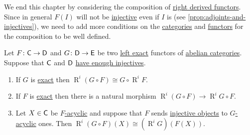 \documentclass[../../main]{subfiles}
\begin{document}
We end this chapter by considering the composition of \hyperref[def:right-derived-functor]{right derived functors}.
Since in general \(F(I)\) will not be \hyperref[def:injective-projective-object]{injective} even if \(I\) is (see \autoref{prop:adjoints-and-injectives}), we need to add more conditions on the \hyperref[def:category]{categories} and \hyperref[def:functor]{functors} for the composition to be well defined.
\begin{theorem}\label{thm:derived-functor-composition}
  Let \(F\colon \mathsf{C} \to \mathsf{D}\) and \(G\colon \mathsf{D} \to \mathsf{E}\) be two \hyperref[def:exact-functor]{left exact} functors of \hyperref[def:abelian-category]{abelian categories}.
  Suppose that \(\mathsf{C}\) and \(\mathsf{D}\) \hyperref[def:enough-injectives-projectives]{have enough injectives}.
  \begin{enumerate}
    \item If \(G\) is \hyperref[def:exact-functor]{exact} then \(\operatorname{R}^{i}(G \circ F) \cong G \circ \operatorname{R}^{i}F\).
    \item If \(F\) is \hyperref[def:exact-functor]{exact} then there is a natural morphism \(\operatorname{R}^{i}(G \circ F) \to \operatorname{R}^{i}G \circ F\).
    \item Let \(X \in \mathsf{C}\) be \hyperref[def:F-acyclic-object]{\(F\)-acyclic} and suppose that \(F\) sends \hyperref[def:injective-projective-object]{injective objects} to \hyperref[def:F-acyclic-object]{\(G\)-acyclic} ones.
          Then \(\operatorname{R}^{i}(G \circ F)(X) \cong (\operatorname{R}^{i}G)(F(X))\).
  \end{enumerate}
\end{theorem}
\end{document}
